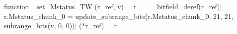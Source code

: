 function _set_Mstatus_TW (r_ref, v) = {
    r = __bitfield_deref(r_ref);
    r.Mstatus_chunk_0 = update_subrange_bits(r.Mstatus_chunk_0, 21, 21, subrange_bits(v, 0, 0));
    (*r_ref) = r
}

